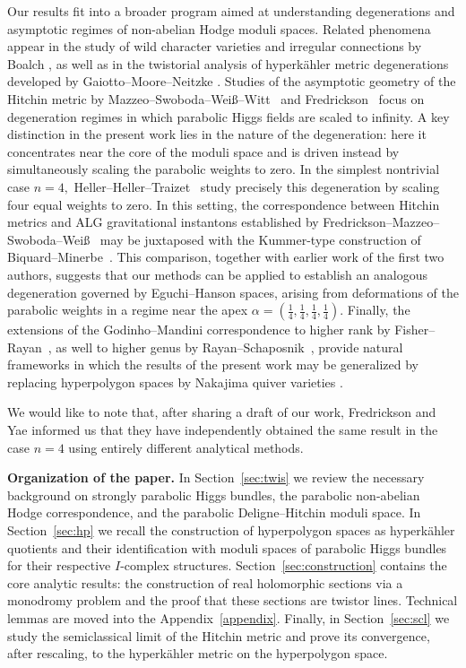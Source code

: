 \documentclass[12pt,a4paper]{amsart}
\theoremstyle{definition}
\theoremstyle{remark}
\begin{document}
Our results fit into a broader program aimed at understanding degenerations and
asymptotic regimes of non-abelian Hodge moduli spaces. Related phenomena appear 
in the study of wild character varieties and irregular
connections by Boalch \cite{Boalch08, Boalch12, Boalch, Boalch18},
 as well as in the 
twistorial analysis of hyperk\"ahler metric
degenerations developed by Gaiotto--Moore--Neitzke \cite{GMN}.
Studies of the asymptotic geometry of the Hitchin metric by Mazzeo--Swoboda--Wei\ss--Witt~\cite{MSWW} and Fredrickson~\cite{Fred} focus on degeneration regimes in which parabolic Higgs fields are scaled to infinity. A key distinction in the present work lies in the nature of the degeneration: here it concentrates near the core of the moduli space and is driven instead by simultaneously scaling the parabolic weights to zero.
In the simplest nontrivial case $n=4,$ Heller--Heller--Traizet~\cite{HellerHellerTraizet2025} study precisely this degeneration by scaling four equal weights to zero. In this setting, the correspondence between Hitchin metrics and ALG gravitational instantons established by Fredrickson--Mazzeo--Swoboda--Wei\ss~\cite{FMSW} may be juxtaposed with the Kummer-type construction of Biquard--Minerbe~\cite{BiquardMinerbe}.
This comparison, together with earlier work \cite{HHS} of the first two authors, suggests that our methods can be applied to establish an analogous degeneration governed by Eguchi--Hanson spaces, arising from deformations of the parabolic weights in a regime near the apex $\alpha=(\tfrac{1}{4},\tfrac{1}{4},\tfrac{1}{4},\tfrac{1}{4}).$
Finally, the extensions of the Godinho--Mandini correspondence
 to higher rank by Fisher--Rayan~\cite{FR16},  
  as well to higher genus by Rayan--Schaposnik~\cite{RS21}, provide natural frameworks in which the results of the present work may be generalized by replacing hyperpolygon spaces by Nakajima quiver varieties \cite{Nak}.

We would like to note that, after sharing a draft of our work,  Fredrickson and Yae \cite{FredYae26} informed us that they have independently obtained the same result in the case $n = 4$ using entirely different analytical methods.

\noindent
\textbf{Organization of the paper.}
In Section~\ref{sec:twis} we review the necessary background on strongly parabolic Higgs bundles, the
parabolic non-abelian Hodge correspondence, and the parabolic Deligne--Hitchin moduli
space.
In Section~\ref{sec:hp} we recall the construction of hyperpolygon spaces as hyperk\"ahler quotients
and their identification with moduli spaces of parabolic Higgs bundles for their respective $I$-complex structures.
Section~\ref{sec:construction} contains the core analytic results: the construction of real holomorphic
sections via a monodromy problem and the proof that these sections are twistor lines.
Technical lemmas are moved into the Appendix~\ref{appendix}.
Finally, in Section~\ref{sec:scl} we study the semiclassical limit of the Hitchin metric and prove
its convergence, after rescaling, to the hyperk\"ahler metric on the hyperpolygon space. 
\end{document}
